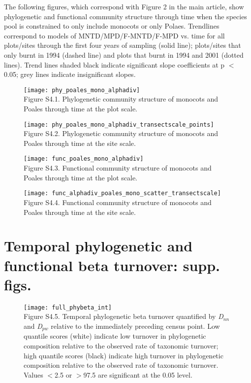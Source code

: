 The following figures, which correspond with Figure 2 in the main article, show phylogenetic and functional community structure through time when the species pool is constrained to only include monocots or only Polaes. Trendlines correspond to models of MNTD/MPD/F-MNTD/F-MPD vs. time for all plots/sites through the first four years of sampling (solid line); plots/sites that only burnt in 1994 (dashed line) and plots that burnt in 1994 and 2001 (dotted lines). Trend lines shaded black indicate significant slope coefficients at p $<$ 0.05; grey lines indicate insignificant slopes.

\begin{figure}[H]
\centering
\texttt{[image: phy\_poales\_mono\_alphadiv]}\\
\footnotesize Figure S4.1. Phylogenetic community structure of monocots and Poales through time at the plot scale.
\end{figure}

\begin{figure}[H]
\centering
\texttt{[image: phy\_poales\_mono\_alphadiv\_transectscale\_points]}\\
\footnotesize Figure S4.2. Phylogenetic community structure of monocots and Poales through time at the site scale.
\end{figure}

\begin{figure}[H]
\centering
\texttt{[image: func\_poales\_mono\_alphadiv]}\\
\footnotesize Figure S4.3. Functional community structure of monocots and Poales through time at the plot scale.
\end{figure}

\begin{figure}[H]
\centering
\texttt{[image: func\_alphadiv\_poales\_mono\_scatter\_transectscale]}\\
\footnotesize Figure S4.4. Functional community structure of monocots and Poales through time at the site scale.
\end{figure}

\clearpage

\section{Temporal phylogenetic and functional beta turnover: supp. figs.}

\begin{figure}[H]
\centering
\texttt{[image: full\_phybeta\_int]}\\
\footnotesize Figure S4.5. Temporal phylogenetic beta turnover quantified by \textit{D}$_{nn}$ and  \textit{D}$_{pw}$ relative to the immediately preceding census point. Low quantile scores (white) indicate low turnover in phylogenetic composition relative to the observed rate of taxonomic turnover; high quantile scores (black) indicate high turnover in phylogenetic composition relative to the observed rate of taxonomic turnover. Values $<$2.5 or $>$97.5 are significant at the 0.05 level.
\end{figure}

